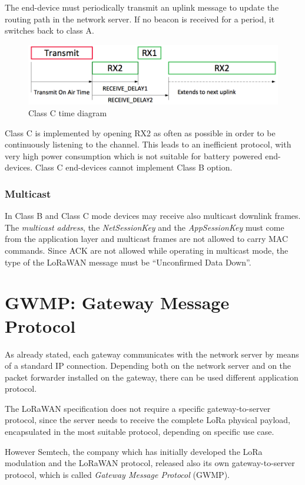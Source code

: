 The end-device must periodically transmit an uplink message to update the routing path in the network server. If no beacon is received for a period, it switches back to class A.

\begin{figure}[]
\centering
\includegraphics[width=\textwidth]{img/class_c}
\caption{Class C time diagram}
\label{fig:classc}
\end{figure}

Class C is implemented by opening RX2 as often as possible in order to be continuously listening to the channel. This leads to an inefficient protocol, with very high power consumption which is not suitable for battery powered end-devices. Class C end-devices cannot implement Class B option.

\subsubsection{Multicast}
In Class B and Class C mode devices may receive also multicast downlink frames. The \emph{multicast address}, the \emph{NetSessionKey} and the \emph{AppSessionKey} must come from the application layer and multicast frames are not allowed to carry MAC commands. Since ACK are not allowed while operating in multicast mode, the type of the LoRaWAN message must be “Unconfirmed Data Down”.



\section{GWMP: Gateway Message Protocol}
\label{sec:gwmp}
As already stated, each gateway communicates with the network server by means of a standard IP connection. Depending both on the network server and on the packet forwarder installed on the gateway, there can be used different application protocol.

The LoRaWAN specification does not require a specific gateway-to-server protocol, since the server needs to receive the complete LoRa physical payload, encapsulated in the most suitable protocol, depending on specific use case.

However Semtech, the company which has initially developed the LoRa modulation and the LoRaWAN protocol, released also its own gateway-to-server protocol, which is called \emph{Gateway Message Protocol} (GWMP).

